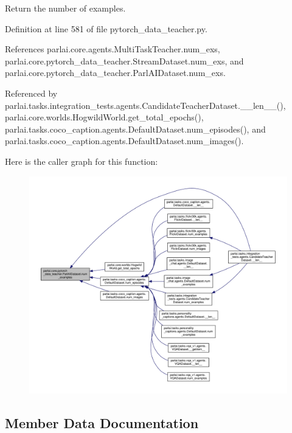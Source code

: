 \begin{DoxyVerb}Return the number of examples.\end{DoxyVerb}
 

Definition at line 581 of file pytorch\+\_\+data\+\_\+teacher.\+py.



References parlai.\+core.\+agents.\+Multi\+Task\+Teacher.\+num\+\_\+exs, parlai.\+core.\+pytorch\+\_\+data\+\_\+teacher.\+Stream\+Dataset.\+num\+\_\+exs, and parlai.\+core.\+pytorch\+\_\+data\+\_\+teacher.\+Parl\+A\+I\+Dataset.\+num\+\_\+exs.



Referenced by parlai.\+tasks.\+integration\+\_\+tests.\+agents.\+Candidate\+Teacher\+Dataset.\+\_\+\+\_\+len\+\_\+\+\_\+(), parlai.\+core.\+worlds.\+Hogwild\+World.\+get\+\_\+total\+\_\+epochs(), parlai.\+tasks.\+coco\+\_\+caption.\+agents.\+Default\+Dataset.\+num\+\_\+episodes(), and parlai.\+tasks.\+coco\+\_\+caption.\+agents.\+Default\+Dataset.\+num\+\_\+images().

Here is the caller graph for this function\+:
\nopagebreak
\begin{figure}[H]
\begin{center}
\leavevmode
\includegraphics[width=350pt]{classparlai_1_1core_1_1pytorch__data__teacher_1_1ParlAIDataset_afc5ca19cf94aad64c75e7799686efc7c_icgraph}
\end{center}
\end{figure}


\subsection{Member Data Documentation}
\mbox{\label{classparlai_1_1core_1_1pytorch__data__teacher_1_1ParlAIDataset_a0306ea2e7c88845945b1712391f45297}} 
